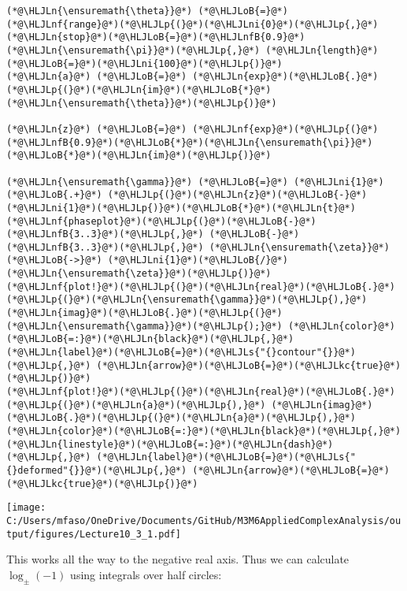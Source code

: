 \documentclass[12pt,a4paper]{article}
\newcommand{\HLJLkc}[1]{\textcolor[RGB]{59,151,46}{\textit{#1}}}
\newcommand{\HLJLn}[1]{#1}
\newcommand{\HLJLnf}[1]{\textcolor[RGB]{66,102,213}{#1}}
\newcommand{\HLJLs}[1]{\textcolor[RGB]{201,61,57}{#1}}
\newcommand{\HLJLnfB}[1]{\textcolor[RGB]{59,151,46}{#1}}
\newcommand{\HLJLni}[1]{\textcolor[RGB]{59,151,46}{#1}}
\newcommand{\HLJLoB}[1]{\textcolor[RGB]{102,102,102}{\textbf{#1}}}
\newcommand{\HLJLp}[1]{#1}
\begin{document}
\begin{lstlisting}
(*@\HLJLn{\ensuremath{\theta}}@*) (*@\HLJLoB{=}@*) (*@\HLJLnf{range}@*)(*@\HLJLp{(}@*)(*@\HLJLni{0}@*)(*@\HLJLp{,}@*) (*@\HLJLn{stop}@*)(*@\HLJLoB{=}@*)(*@\HLJLnfB{0.9}@*)(*@\HLJLn{\ensuremath{\pi}}@*)(*@\HLJLp{,}@*) (*@\HLJLn{length}@*)(*@\HLJLoB{=}@*)(*@\HLJLni{100}@*)(*@\HLJLp{)}@*)
(*@\HLJLn{a}@*) (*@\HLJLoB{=}@*) (*@\HLJLn{exp}@*)(*@\HLJLoB{.}@*)(*@\HLJLp{(}@*)(*@\HLJLn{im}@*)(*@\HLJLoB{*}@*)(*@\HLJLn{\ensuremath{\theta}}@*)(*@\HLJLp{)}@*)

(*@\HLJLn{z}@*) (*@\HLJLoB{=}@*) (*@\HLJLnf{exp}@*)(*@\HLJLp{(}@*)(*@\HLJLnfB{0.9}@*)(*@\HLJLoB{*}@*)(*@\HLJLn{\ensuremath{\pi}}@*)(*@\HLJLoB{*}@*)(*@\HLJLn{im}@*)(*@\HLJLp{)}@*)

(*@\HLJLn{\ensuremath{\gamma}}@*) (*@\HLJLoB{=}@*) (*@\HLJLni{1}@*) (*@\HLJLoB{.+}@*) (*@\HLJLp{(}@*)(*@\HLJLn{z}@*)(*@\HLJLoB{-}@*)(*@\HLJLni{1}@*)(*@\HLJLp{)}@*)(*@\HLJLoB{*}@*)(*@\HLJLn{t}@*)
(*@\HLJLnf{phaseplot}@*)(*@\HLJLp{(}@*)(*@\HLJLoB{-}@*)(*@\HLJLnfB{3..3}@*)(*@\HLJLp{,}@*) (*@\HLJLoB{-}@*)(*@\HLJLnfB{3..3}@*)(*@\HLJLp{,}@*) (*@\HLJLn{\ensuremath{\zeta}}@*) (*@\HLJLoB{->}@*) (*@\HLJLni{1}@*)(*@\HLJLoB{/}@*)(*@\HLJLn{\ensuremath{\zeta}}@*)(*@\HLJLp{)}@*)
(*@\HLJLnf{plot!}@*)(*@\HLJLp{(}@*)(*@\HLJLn{real}@*)(*@\HLJLoB{.}@*)(*@\HLJLp{(}@*)(*@\HLJLn{\ensuremath{\gamma}}@*)(*@\HLJLp{),}@*) (*@\HLJLn{imag}@*)(*@\HLJLoB{.}@*)(*@\HLJLp{(}@*)(*@\HLJLn{\ensuremath{\gamma}}@*)(*@\HLJLp{);}@*) (*@\HLJLn{color}@*)(*@\HLJLoB{=:}@*)(*@\HLJLn{black}@*)(*@\HLJLp{,}@*) (*@\HLJLn{label}@*)(*@\HLJLoB{=}@*)(*@\HLJLs{"{}contour"{}}@*)(*@\HLJLp{,}@*) (*@\HLJLn{arrow}@*)(*@\HLJLoB{=}@*)(*@\HLJLkc{true}@*)(*@\HLJLp{)}@*)
(*@\HLJLnf{plot!}@*)(*@\HLJLp{(}@*)(*@\HLJLn{real}@*)(*@\HLJLoB{.}@*)(*@\HLJLp{(}@*)(*@\HLJLn{a}@*)(*@\HLJLp{),}@*) (*@\HLJLn{imag}@*)(*@\HLJLoB{.}@*)(*@\HLJLp{(}@*)(*@\HLJLn{a}@*)(*@\HLJLp{),}@*) (*@\HLJLn{color}@*)(*@\HLJLoB{=:}@*)(*@\HLJLn{black}@*)(*@\HLJLp{,}@*) (*@\HLJLn{linestyle}@*)(*@\HLJLoB{=:}@*)(*@\HLJLn{dash}@*)(*@\HLJLp{,}@*) (*@\HLJLn{label}@*)(*@\HLJLoB{=}@*)(*@\HLJLs{"{}deformed"{}}@*)(*@\HLJLp{,}@*) (*@\HLJLn{arrow}@*)(*@\HLJLoB{=}@*)(*@\HLJLkc{true}@*)(*@\HLJLp{)}@*)
\end{lstlisting}

\texttt{[image: C:/Users/mfaso/OneDrive/Documents/GitHub/M3M6AppliedComplexAnalysis/output/figures/Lecture10\_3\_1.pdf]}

This works all the way to the negative real axis. Thus we can calculate $\log_\pm (-1)$ using integrals over half circles:
\end{document}
